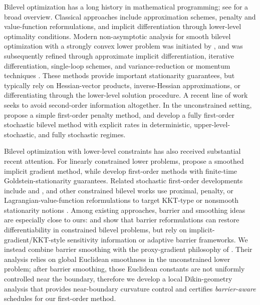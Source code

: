 \documentclass{article}
\begin{document}
Bilevel optimization has a long history in mathematical programming; see
\citet{colson2007overview} for a broad overview. Classical approaches include approximation
schemes, penalty and value-function reformulations, and implicit differentiation through lower-level
optimality conditions. Modern non-asymptotic analysis for smooth bilevel optimization with a
strongly convex lower problem was initiated by \citet{ghadimi2018approximation}, and was
subsequently refined through approximate implicit differentiation, iterative differentiation,
single-loop schemes, and variance-reduction or momentum techniques
\citep{ji2021bilevel,hong2023two,chen2021closing,chen2022single,dagreou2022framework,
khanduri2021near,yang2021provably,yang2023achieving}. These methods provide important
stationarity guarantees, but typically rely on Hessian-vector products, inverse-Hessian
approximations, or differentiating through the lower-level solution procedure.
A recent line of work seeks to avoid second-order information altogether. In the unconstrained
setting, \citet{liu2022bome} propose a simple first-order penalty method, and
\citet{kwon2023fully} develop a fully first-order stochastic bilevel method with explicit rates in
deterministic, upper-level-stochastic, and fully stochastic regimes. 

Bilevel optimization with lower-level constraints has also received substantial recent attention.
For linearly constrained lower problems, \citet{khanduri2023linearly} propose a smoothed implicit
gradient method, while \citet{kornowski2024first} develop first-order methods with finite-time
Goldstein-stationarity guarantees. Related stochastic first-order developments include
\citet{phan2025bridging} and \citet{shen2026a}, and other constrained bilevel works use
proximal, penalty, or Lagrangian-value-function reformulations to target KKT-type or nonsmooth
stationarity notions \citep{yao2024constrained,jiang2024primal}. Among existing approaches,
barrier and smoothing ideas are especially close to ours: \citet{tsaknakis2023implicit} and
\citet{jiang2024barrier} show that barrier reformulations can restore differentiability in constrained
bilevel problems, but rely on implicit-gradient/KKT-style sensitivity information or adaptive barrier
frameworks. We instead combine barrier smoothing with the proxy-gradient philosophy of
\citet{kwon2023fully}. Their analysis relies on global Euclidean smoothness in the unconstrained lower problem; after barrier smoothing,
those Euclidean constants are not uniformly controlled near the boundary, therefore we develop a local Dikin-geometry analysis that provides
near-boundary curvature control and certifies \textit{barrier-aware} schedules for our first-order method.
\end{document}
